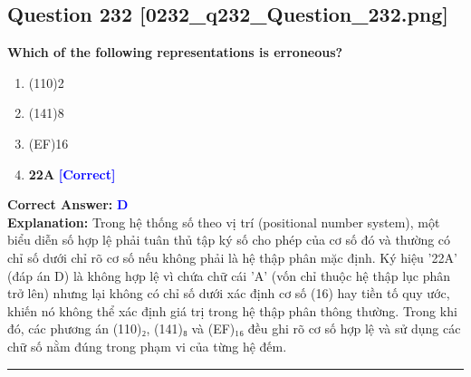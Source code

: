 \documentclass[11pt,a4paper]{article}
\begin{document}
\begin{minipage}{\textwidth}
\subsection*{Question 232 \quad \footnotesize{[0232\_q232\_Question\_232.png]}}
\noindent \textbf{Which of the following representations is erroneous?}

\begin{enumerate}[label=\Alph*.]
    \item (110)2
    \item (141)8
    \item (EF)16
    \item \textbf{22A} \hfill \textcolor{blue}{\textbf{[Correct]}}
\end{enumerate}

\noindent \textbf{Correct Answer:} \textcolor{blue}{\textbf{D}} \\[2pt]
\noindent \textbf{Explanation:} Trong hệ thống số theo vị trí (positional number system), một biểu diễn số hợp lệ phải tuân thủ tập ký số cho phép của cơ số đó và thường có chỉ số dưới chỉ rõ cơ số nếu không phải là hệ thập phân mặc định. Ký hiệu '22A' (đáp án D) là không hợp lệ vì chứa chữ cái 'A' (vốn chỉ thuộc hệ thập lục phân trở lên) nhưng lại không có chỉ số dưới xác định cơ số (16) hay tiền tố quy ước, khiến nó không thể xác định giá trị trong hệ thập phân thông thường. Trong khi đó, các phương án (110)₂, (141)₈ và (EF)₁₆ đều ghi rõ cơ số hợp lệ và sử dụng các chữ số nằm đúng trong phạm vi của từng hệ đếm.

\par\vspace{0.3cm}
\hrule
\vspace{0.3cm}
\end{minipage}
\end{document}
